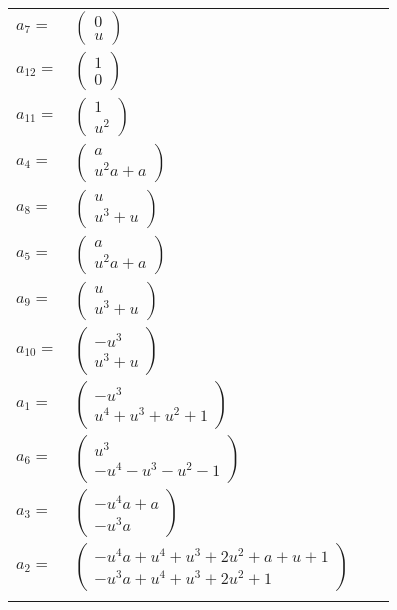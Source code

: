 \documentclass[1p]{elsarticle_modified}
\theoremstyle{definition}
\begin{document}
\begin{tabular}{m{7pt} m{180pt} m{7pt} m{180pt} }
\flushright $a_{7}=$&$\begin{pmatrix}0\\u\end{pmatrix}$ \\
\flushright $a_{12}=$&$\begin{pmatrix}1\\0\end{pmatrix}$ \\
\flushright $a_{11}=$&$\begin{pmatrix}1\\u^2\end{pmatrix}$ \\
\flushright $a_{4}=$&$\begin{pmatrix}a\\u^2 a+a\end{pmatrix}$ \\
\flushright $a_{8}=$&$\begin{pmatrix}u\\u^3+u\end{pmatrix}$ \\
\flushright $a_{5}=$&$\begin{pmatrix}a\\u^2 a+a\end{pmatrix}$ \\
\flushright $a_{9}=$&$\begin{pmatrix}u\\u^3+u\end{pmatrix}$ \\
\flushright $a_{10}=$&$\begin{pmatrix}- u^3\\u^3+u\end{pmatrix}$ \\
\flushright $a_{1}=$&$\begin{pmatrix}- u^3\\u^4+u^3+u^2+1\end{pmatrix}$ \\
\flushright $a_{6}=$&$\begin{pmatrix}u^3\\- u^4- u^3- u^2-1\end{pmatrix}$ \\
\flushright $a_{3}=$&$\begin{pmatrix}- u^4 a+a\\- u^3 a\end{pmatrix}$ \\
\flushright $a_{2}=$&$\begin{pmatrix}- u^4 a+u^4+u^3+2 u^2+a+u+1\\- u^3 a+u^4+u^3+2 u^2+1\end{pmatrix}$\\&\end{tabular}
\end{document}
